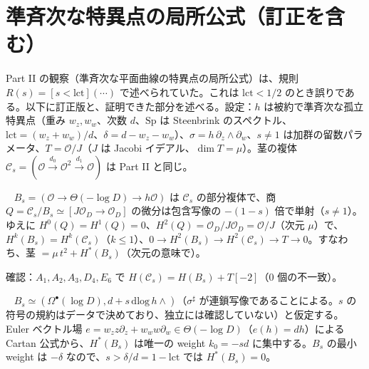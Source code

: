 \section{準斉次な特異点の局所公式（訂正を含む）}\label{sec:local}
Part II の観察（準斉次な平面曲線の特異点の局所公式）は、規則 $R(s)=[s<\mathrm{lct}](\cdots)$ で述べられていた。これは $\mathrm{lct}<1/2$ のとき誤りである。以下に訂正版と、証明できた部分を述べる。設定：$h$ は被約で準斉次な孤立特異点（重み $w_z,w_w$、次数 $d$、$\mathrm{Sp}$ は Steenbrink のスペクトル、$\mathrm{lct}=(w_z+w_w)/d$、$\delta=d-w_z-w_w$）、$\sigma=h\,\partial_z\wedge\partial_w$、$s\ne1$ は加群の留数パラメータ、$T=\mathcal O/J$（$J$ は Jacobi イデアル、$\dim T=\mu$）。茎の複体 $\mathcal C_s=(\mathcal O\xrightarrow{d_0}\mathcal O^2\xrightarrow{d_1}\mathcal O)$ は Part II と同じ。
\begin{prop}\tP\ \tV\label{prop:Q}
$B_s=(\mathcal O\to\Theta(-\log D)\to h\mathcal O)$ は $\mathcal C_s$ の部分複体で、商 $Q=\mathcal C_s/B_s\simeq[J\mathcal O_D\to\mathcal O_D]$ の微分は包含写像の $-(1-s)$ 倍で単射（$s\ne1$）。ゆえに $H^0(Q)=H^1(Q)=0$、$H^2(Q)=\mathcal O_D/J\mathcal O_D=\mathcal O/J$（次元 $\mu$）で、$H^k(B_s)=H^k(\mathcal C_s)$（$k\le1$）、$0\to H^2(B_s)\to H^2(\mathcal C_s)\to T\to0$。すなわち、茎 $=\mu\,t^2+H^*(B_s)$（次元の意味で）。
\end{prop}
\noindent 確認：$A_1,A_2,A_3,D_4,E_6$ で $H(\mathcal C_s)=H(B_s)+T[-2]$（0 個の不一致）\tV。
\begin{prop}\tP\ \tQ\label{prop:weight}
$B_s\simeq(\Omega^\bullet(\log D),d+s\,\mathrm{dlog}\,h\wedge)$（$\sigma^\sharp$ が連鎖写像であることによる。$s$ の符号の規約はデータで決めており、独立には確認していない）と仮定する。Euler ベクトル場 $e=w_zz\partial_z+w_ww\partial_w\in\Theta(-\log D)$（$e(h)=dh$）による Cartan 公式から、$H^*(B_s)$ は唯一の weight $k_0=-sd$ に集中する。$B_s$ の最小 weight は $-\delta$ なので、$s>\delta/d=1-\mathrm{lct}$ では $H^*(B_s)=0$。
\end{prop}
